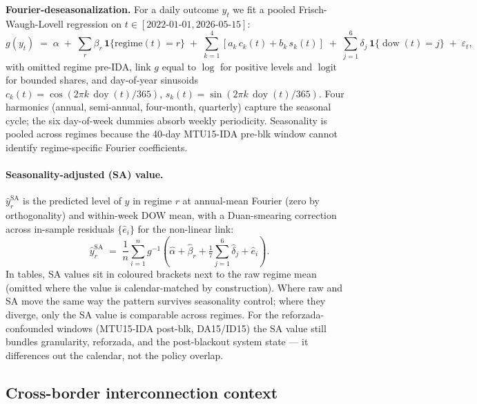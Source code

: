 \documentclass[11pt,a4paper]{article}
\begin{document}
\noindent\textbf{Fourier-deseasonalization.} For a daily outcome $y_t$ we fit a pooled Frisch-Waugh-Lovell regression on $t \in [2022\text{-}01\text{-}01, 2026\text{-}05\text{-}15]$:
\[
g(y_t) \;=\; \alpha \;+\; \sum_{r} \beta_r \,\mathbf{1}\{\text{regime}(t) = r\} \;+\; \sum_{k=1}^{4} \left[ a_k\, c_k(t) + b_k\, s_k(t) \right] \;+\; \sum_{j=1}^{6} \delta_j\, \mathbf{1}\{\operatorname{dow}(t) = j\} \;+\; \varepsilon_t,
\]
with omitted regime pre-IDA, link $g$ equal to $\log$ for positive levels and $\operatorname{logit}$ for bounded shares, and day-of-year sinusoids $c_k(t)=\cos(2\pi k\,\operatorname{doy}(t)/365)$, $s_k(t)=\sin(2\pi k\,\operatorname{doy}(t)/365)$. Four harmonics (annual, semi-annual, four-month, quarterly) capture the seasonal cycle; the six day-of-week dummies absorb weekly periodicity. Seasonality is pooled across regimes because the 40-day MTU15-IDA pre-blk window cannot identify regime-specific Fourier coefficients.

\paragraph{Seasonality-adjusted (SA) value.} $\hat y_r^{\text{SA}}$ is the predicted level of $y$ in regime $r$ at annual-mean Fourier (zero by orthogonality) and within-week DOW mean, with a Duan-smearing correction across in-sample residuals $\{\widehat e_i\}$ for the non-linear link:
\[
\hat y_r^{\text{SA}} \;=\; \frac{1}{n}\sum_{i=1}^{n} g^{-1}\!\left(\widehat\alpha + \widehat\beta_r + \tfrac{1}{7}\sum_{j=1}^{6}\widehat\delta_j + \widehat e_i\right).
\]
In tables, SA values sit in {\color{seasoncol}coloured brackets} next to the raw regime mean (omitted where the value is calendar-matched by construction). Where raw and SA move the same way the pattern survives seasonality control; where they diverge, only the SA value is comparable across regimes. For the reforzada-confounded windows (MTU15-IDA post-blk, DA15/ID15) the SA value still bundles granularity, reforzada, and the post-blackout system state --- it differences out the calendar, not the policy overlap.

\bigskip

\subsection*{Cross-border interconnection context}\label{sec:bid_internal:crossborder}
\end{document}
